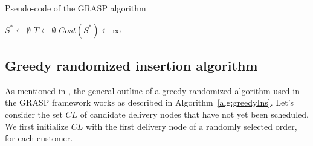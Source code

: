 \documentclass{article}
\begin{document}
{
    {\small
        \begin{algorithm}[hpt]
            \caption{Pseudo-code of the GRASP algorithm }
            \label{alg_grasp}
            \DontPrintSemicolon
            \LinesNumbered
            \setcounter{AlgoLine}{0}
            $S^* \leftarrow \emptyset$    \hspace{2mm} $T \leftarrow \emptyset$       $Cost(S^*) \leftarrow \infty$


        \end{algorithm}}
}
 
\subsection{Greedy randomized insertion algorithm}

As mentioned in \cite{resende2019greedy}, the general outline of a greedy randomized algorithm used in the GRASP framework works as described in Algorithm~\ref{alg:greedyIns}. Let's consider the set $CL$ of candidate delivery nodes that have not yet been scheduled. We first initialize $CL$ with the first delivery node of a randomly selected order, for each customer.
\end{document}
